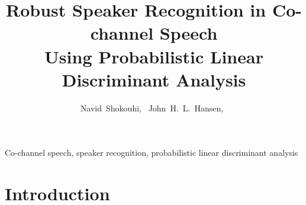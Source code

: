 \documentclass[journal]{IEEEtran}
\begin{document}
\title{Robust Speaker Recognition in Co-channel Speech \\
		Using Probabilistic Linear Discriminant Analysis}
%
%
%

\author{Navid~Shokouhi,~
	John~H.~L.~Hansen,~}

\maketitle



\begin{IEEEkeywords}
Co-channel speech, speaker recognition, probabilistic linear discriminant analysis
\end{IEEEkeywords}






%
\IEEEpeerreviewmaketitle



\section{Introduction}
\label{sec:introduction}
\end{document}
